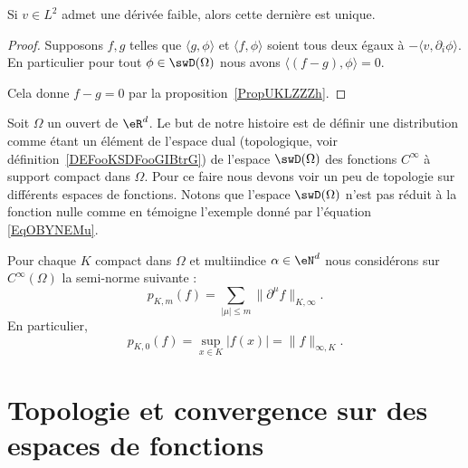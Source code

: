 \begin{lemma}
    Si \( v\in L^2\) admet une dérivée faible, alors cette dernière est unique.
\end{lemma}

\begin{proof}
    Supposons \( f,g\) telles que \( \langle g, \phi\rangle \) et \( \langle f, \phi\rangle \) soient tous deux égaux à \( -\langle v, \partial_i\phi\rangle \). En particulier pour tout \( \phi\in  \swD(\Omega)\) nous avons \( \langle (f-g), \phi\rangle =0\).

    Cela donne \( f-g=0\) par la proposition~\ref{PropUKLZZZh}.
\end{proof}

Soit \( \Omega\) un ouvert de \( \eR^d\). Le but de notre histoire est de définir une distribution comme étant un élément de l'espace dual (topologique, voir définition~\ref{DEFooKSDFooGIBtrG}) de l'espace \( \swD(\Omega)\) des fonctions \( C^{\infty}\) à support compact dans \( \Omega\). Pour ce faire nous devons voir un peu de topologie sur différents espaces de fonctions. Notons que l'espace \( \swD(\Omega)\) n'est pas réduit à la fonction nulle comme en témoigne l'exemple donné par l'équation \eqref{EqOBYNEMu}.

Pour chaque \( K\) compact dans \( \Omega\) et multiindice \( \alpha\in \eN^d\) nous considérons sur \(  C^{\infty}(\Omega)\) la semi-norme suivante :
\begin{equation}    \label{EQooZSQUooAJRIFe}
    p_{K,m}(f)=\sum_{| \mu |\leq m}\| \partial^{\mu}f \|_{K,\infty}.
\end{equation}
En particulier,
\begin{equation}
    p_{K,0}(f)=\sup_{x\in K}| f(x) |=\| f \|_{\infty,K}.
\end{equation}

\section{Topologie et convergence sur des espaces de fonctions}

